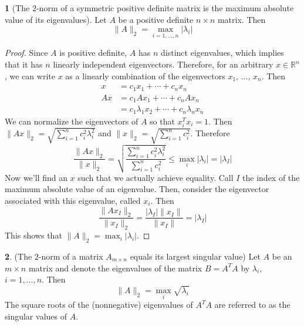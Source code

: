 \documentclass[12pt]{article}
\theoremstyle{definition}
\newcommand{\R}{\mathbb{R}}
\newcommand{\norm}[1]{\lVert#1\rVert}
\newtheorem{theorem}{\color{ForestGreen}{\textbf{Theorem}}}
\theoremstyle{definition}
\begin{document}
\begin{theorem}[The $2$-norm of a symmetric positive definite matrix is the maximum absolute value of its eigenvalues]
Let $A$ be a positive definite $n \times n$ matrix. Then 
\begin{equation}
	\norm{A}_2 = \max_{i=1,\ldots, n} |\lambda_i|
\end{equation}
\end{theorem}
\begin{proof}
Since $A$ is positive definite, $A$ has $n$ distinct eigenvalues, which implies that it has $n$ linearly independent eigenvectors. Therefore, for an arbitrary $x \in \R^n$, we can write $x$ as a linearly combination of the eigenvectors $x_1$, $\ldots$, $x_n$. Then
\begin{align*}
	x &= c_1 x_1 + \cdots + c_n x_n \\
	A x &= c_1 A x_1 + \cdots + c_n A x_n \\
	&= c_1 \lambda_1 x_2 + \cdots + c_n \lambda_n x_n 
\end{align*}
We can normalize the eigenvectors of $A$ so that $x_i^T x_i = 1$. Then $\norm{Ax}_2 = \sqrt{\sum_{i=1}^n c_i^2 \lambda_i^2}$ and $\norm{x}_2 = \sqrt{\sum_{i=1}^n c_i^2}$. Therefore 
\begin{equation}
	\frac{\norm{Ax}_2}{\norm{x}_2} = \sqrt{\frac{\sum_{i=1}^n c_i^2 \lambda_i^2}{\sum_{i=1}^n c_i^2}} \leq \max_i |\lambda_i| = |\lambda_I|
\end{equation}
Now we'll find an $x$ such that we actually achieve equality. Call $I$ the index of the maximum absolute value of an eigenvalue. Then, consider the eigenvector associated with this eigenvalue, called $x_i$. Then
\begin{equation}
	\frac{\norm{Ax_I}_2}{\norm{x_I}_2} = \frac{|\lambda_I|\norm{x_I}}{\norm{x_I}} = |\lambda_I|
\end{equation}
This shows that $\norm{A}_2 =  \max_i |\lambda_i|$.
\end{proof}

\begin{theorem}(The $2$-norm of a matrix $A_{m \times n}$ equals its largest singular value)
Let $A$ be an $m \times n$ matrix and denote the eigenvalues of the matrix $B = A^TA$ by $\lambda_i$, $i=1,\ldots, n$. Then 
\begin{equation}
	\norm{A}_2 = \max_i \sqrt{\lambda_i}
\end{equation}
The square roots of the (nonnegative) eigenvalues of $A^TA$ are referred to as the singular values of $A$.
\end{theorem}
\end{document}

